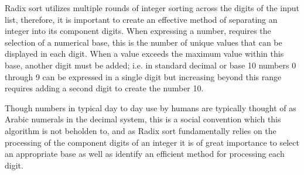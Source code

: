 \documentclass[12pt]{article}
\begin{document}
	\label{sec:radixselection}
	Radix sort utilizes multiple rounds of integer sorting across the digits of the input list, therefore, it is important to create an effective method of separating an integer into its component digits. When expressing a number, requires the selection of a numerical base, this is the number of unique values that can be displayed in each digit. When a value exceeds the maximum value within this base, another digit must be added; i.e. in standard decimal or base 10 numbers 0 through 9 can be expressed in a single digit but increasing beyond this range requires adding a second digit to create the number 10.
	\par
	Though numbers in typical day to day use by humans are typically thought of as Arabic numerals in the decimal system, this is a social convention which this algorithm is not beholden to, and as Radix sort fundamentally relies on the processing of the component digits of an integer it is of great importance to select an appropriate base as well as identify an efficient method for processing each digit.
\end{document}
